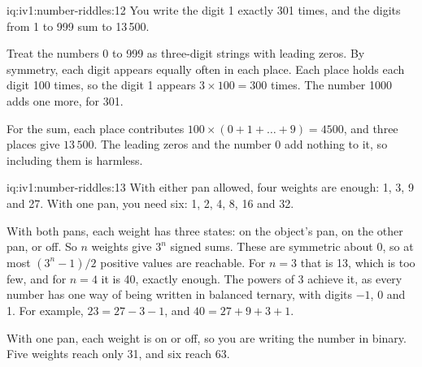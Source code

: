 \begin{solution}{iq:iv1:number-riddles:12}
You write the digit 1 exactly 301 times, and the digits from 1 to 999 sum to 13\,500.

Treat the numbers 0 to 999 as three-digit strings with leading zeros. By symmetry, each digit appears equally often in each place. Each place holds each digit 100 times, so the digit 1 appears $3 \times 100 = 300$ times. The number 1000 adds one more, for 301.

For the sum, each place contributes $100 \times (0 + 1 + \dots + 9) = 4500$, and three places give $13\,500$. The leading zeros and the number 0 add nothing to it, so including them is harmless.

\end{solution}

\begin{solution}{iq:iv1:number-riddles:13}
With either pan allowed, four weights are enough: 1, 3, 9 and 27. With one pan, you need six: 1, 2, 4, 8, 16 and 32.

With both pans, each weight has three states: on the object's pan, on the other pan, or off. So $n$ weights give $3^n$ signed sums. These are symmetric about 0, so at most $(3^n - 1)/2$ positive values are reachable. For $n = 3$ that is 13, which is too few, and for $n = 4$ it is 40, exactly enough. The powers of 3 achieve it, as every number has one way of being written in balanced ternary, with digits $-1$, 0 and 1. For example, $23 = 27 - 3 - 1$, and $40 = 27 + 9 + 3 + 1$.

With one pan, each weight is on or off, so you are writing the number in binary. Five weights reach only 31, and six reach 63.

\end{solution}

